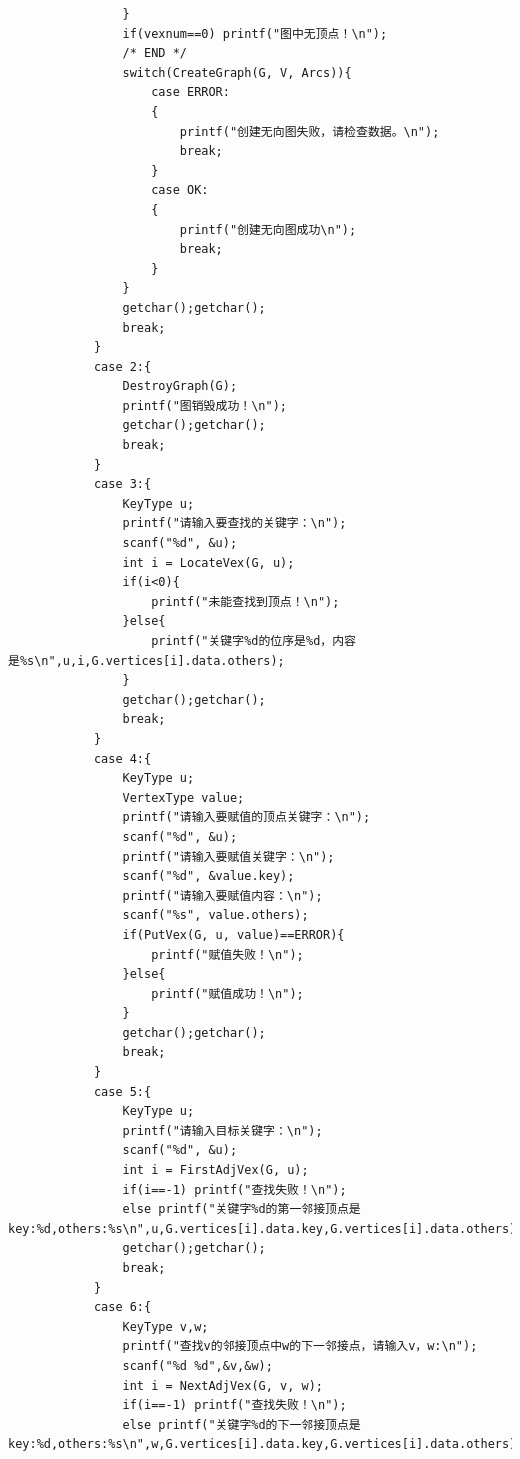\documentclass[supercite]{Experimental_Report}
\theoremstyle{definition}
\begin{document}
\begin{lstlisting}
                }
                if(vexnum==0) printf("图中无顶点！\n");
                /* END */
                switch(CreateGraph(G, V, Arcs)){
                    case ERROR:
                    {
                        printf("创建无向图失败，请检查数据。\n");
                        break;
                    }
                    case OK:
                    {
                        printf("创建无向图成功\n");
                        break;
                    }
                }
                getchar();getchar();
                break;
            }
            case 2:{
                DestroyGraph(G);
                printf("图销毁成功！\n");
                getchar();getchar();
                break;
            }
            case 3:{
                KeyType u;
                printf("请输入要查找的关键字：\n");
                scanf("%d", &u);
                int i = LocateVex(G, u);
                if(i<0){
                    printf("未能查找到顶点！\n");
                }else{
                    printf("关键字%d的位序是%d，内容是%s\n",u,i,G.vertices[i].data.others);
                }
                getchar();getchar();
                break;
            }
            case 4:{
                KeyType u;
                VertexType value;
                printf("请输入要赋值的顶点关键字：\n");
                scanf("%d", &u);
                printf("请输入要赋值关键字：\n");
                scanf("%d", &value.key);
                printf("请输入要赋值内容：\n");
                scanf("%s", value.others);
                if(PutVex(G, u, value)==ERROR){
                    printf("赋值失败！\n");
                }else{
                    printf("赋值成功！\n");
                }
                getchar();getchar();
                break;
            }
            case 5:{
                KeyType u;
                printf("请输入目标关键字：\n");
                scanf("%d", &u);
                int i = FirstAdjVex(G, u);
                if(i==-1) printf("查找失败！\n");
                else printf("关键字%d的第一邻接顶点是key:%d,others:%s\n",u,G.vertices[i].data.key,G.vertices[i].data.others);
                getchar();getchar();
                break;
            }
            case 6:{
                KeyType v,w;
                printf("查找v的邻接顶点中w的下一邻接点，请输入v，w:\n");
                scanf("%d %d",&v,&w);
                int i = NextAdjVex(G, v, w);
                if(i==-1) printf("查找失败！\n");
                else printf("关键字%d的下一邻接顶点是key:%d,others:%s\n",w,G.vertices[i].data.key,G.vertices[i].data.others);

\end{lstlisting}
\end{document}
